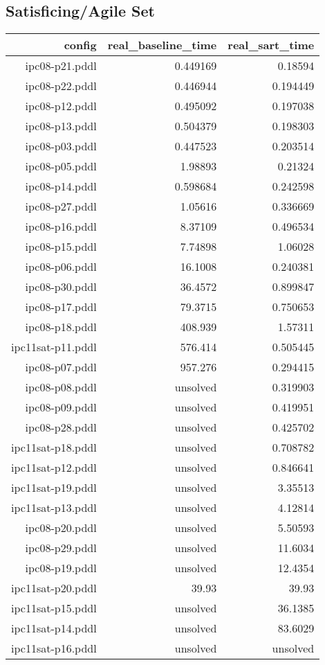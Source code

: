 \documentclass{article}
\begin{document}
                    
                    \subsection*{Satisficing/Agile Set}
                    
                            \begin{center}
                            \scriptsize
                            \begin{tabular}{r|r|r}
                            config & real\_baseline\_time & real\_sart\_time\\\midrule
                             ipc08-p21.pddl&0.449169&0.18594\\
 ipc08-p22.pddl&0.446944&0.194449\\
 ipc08-p12.pddl&0.495092&0.197038\\
 ipc08-p13.pddl&0.504379&0.198303\\
 ipc08-p03.pddl&0.447523&0.203514\\
 ipc08-p05.pddl&1.98893&0.21324\\
 ipc08-p14.pddl&0.598684&0.242598\\
 ipc08-p27.pddl&1.05616&0.336669\\
 ipc08-p16.pddl&8.37109&0.496534\\
 ipc08-p15.pddl&7.74898&1.06028\\
 ipc08-p06.pddl&16.1008&0.240381\\
 ipc08-p30.pddl&36.4572&0.899847\\
 ipc08-p17.pddl&79.3715&0.750653\\
 ipc08-p18.pddl&408.939&1.57311\\
 ipc11sat-p11.pddl&576.414&0.505445\\
 ipc08-p07.pddl&957.276&0.294415\\
 ipc08-p08.pddl&unsolved&0.319903\\
 ipc08-p09.pddl&unsolved&0.419951\\
 ipc08-p28.pddl&unsolved&0.425702\\
 ipc11sat-p18.pddl&unsolved&0.708782\\
 ipc11sat-p12.pddl&unsolved&0.846641\\
 ipc11sat-p19.pddl&unsolved&3.35513\\
 ipc11sat-p13.pddl&unsolved&4.12814\\
 ipc08-p20.pddl&unsolved&5.50593\\
 ipc08-p29.pddl&unsolved&11.6034\\
 ipc08-p19.pddl&unsolved&12.4354\\
 ipc11sat-p20.pddl&39.93&39.93\\
 ipc11sat-p15.pddl&unsolved&36.1385\\
 ipc11sat-p14.pddl&unsolved&83.6029\\
 ipc11sat-p16.pddl&unsolved&unsolved
                            \end{tabular}
                            \end{center}
                    
\end{document}
